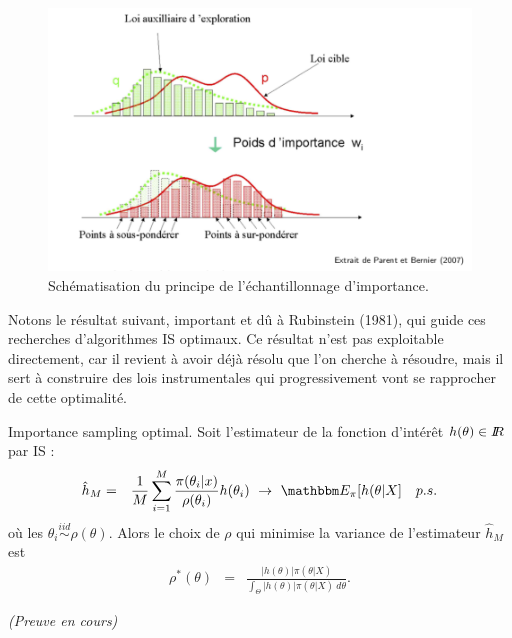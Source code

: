 \begin{figure}[h!]
\centering
\includegraphics[scale=0.3]{figures/calcul/is.png}
\caption{Schématisation du principe de l'échantillonnage d'importance.}
\label{resume-IS}
\end{figure}

Notons le résultat suivant, important et dû à Rubinstein (1981), qui guide ces recherches d'algorithmes IS optimaux. Ce résultat n'est pas exploitable directement, car il revient à avoir déjà résolu que l'on cherche à résoudre, mais il sert à construire des lois instrumentales qui progressivement vont se rapprocher de cette optimalité. 

\begin{theorem}{Importance sampling optimal.}
Soit l'estimateur de la fonction d'intérêt $h(\theta)\in I\!\!R$ par IS :
\begin{eqnarray*}
\hat{h}_M & = & \frac{1}{M}\sum\limits_{i=1}^M \frac{\pi(\theta_i|x)}{\rho(\theta_i)} h(\theta_i) \ \to \ \E_{\pi}[h(\theta|X] \ \ \ p.s.
\end{eqnarray*}
où les $\theta_i\overset{iid}{\sim} \rho(\theta)$. Alors le choix de $\rho$ qui minimise la variance de l'estimateur $\hat{h}_M$ est 
\begin{eqnarray*}
\rho^*(\theta) & = & \frac{|h(\theta)|\pi(\theta|X)}{\int_{\Theta}|h(\theta)|\pi(\theta|X) \ d\theta}.
\end{eqnarray*}
\end{theorem}

\if{} \vspace{1cm} 
\fi
\if{} {\it (Preuve en cours)}
\fi
\vspace{1cm}



